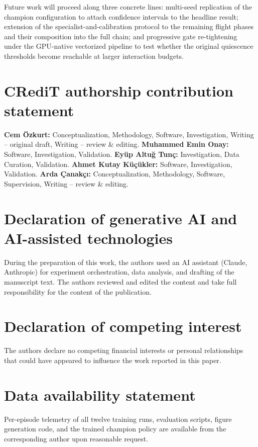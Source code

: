 \documentclass[11pt,a4paper]{article}
\begin{document}
Future work will proceed along three concrete lines: multi-seed replication of the champion configuration to attach confidence intervals to the headline result; extension of the specialist-and-calibration protocol to the remaining flight phases and their composition into the full chain; and progressive gate re-tightening under the GPU-native vectorized pipeline to test whether the original quiescence thresholds become reachable at larger interaction budgets.


\section*{CRediT authorship contribution statement}
\textbf{Cem \"Ozkurt:} Conceptualization, Methodology, Software, Investigation, Writing -- original draft, Writing -- review \& editing. \textbf{Muhammed Emin Onay:} Software, Investigation, Validation. \textbf{Ey\"up Altu\u{g} Tun\c{c}:} Investigation, Data Curation, Validation. \textbf{Ahmet Kutay K\"u\c{c}\"ukler:} Software, Investigation, Validation. \textbf{Arda \c{C}anak\c{c}\i:} Conceptualization, Methodology, Software, Supervision, Writing -- review \& editing.

\section*{Declaration of generative AI and AI-assisted technologies}

During the preparation of this work, the authors used an AI assistant (Claude, Anthropic) for experiment orchestration, data analysis, and drafting of the manuscript text. The authors reviewed and edited the content and take full responsibility for the content of the publication.


\section*{Declaration of competing interest}

The authors declare no competing financial interests or personal relationships that could have appeared to influence the work reported in this paper.


\section*{Data availability statement}

Per-episode telemetry of all twelve training runs, evaluation scripts, figure generation code, and the trained champion policy are available from the corresponding author upon reasonable request.




\end{document}
